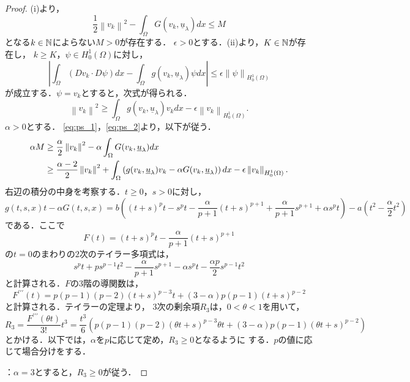 \begin{proof}
 (i)より，
 \begin{equation}
  \frac{1}{2} \left\| v_k \right\|^2 - \int_\Omega G(v_k,
   \underline{u}_\lambda )dx \leq M \label{eq:ps_1}
 \end{equation}
 となる$k \in \mathbb{N}$によらない$M > 0$が存在する．
 $\epsilon > 0$とする．(ii)より，$K \in \mathbb{N}$が存在し，
 $k \geq K$，$\psi \in H_0^1(\Omega)$に対し，
 \[
  \left\lvert \int_\Omega (D v_k \cdot D \psi) dx - \int_\Omega g(v_k,
 \underline{u}_\lambda)\psi dx \right\rvert \leq \epsilon \left\| \psi
 \right\|_{H_0^1(\Omega) }
 \]
 が成立する．$\psi = v_k$とすると，次式が得られる．
 \begin{equation}
  \left\| v_k \right\|^2 \geq \int_\Omega g(v_k,
   \underline{u}_\lambda)v_k dx - \epsilon \left\| v_k
   \right\|_{H_0^1(\Omega)}. \label{eq:ps_2}
 \end{equation}
 $\alpha > 0$とする．
 \eqref{eq:ps_1}，\eqref{eq:ps_2}より，以下が従う．
 \begin{align}
  \alpha M &\geq  \frac{\alpha}{2} \left\| v_k \right\|^2 - \alpha
  \int_\Omega G(v_k, \underline{u}_\lambda) dx \notag \\
  & \geq \frac{\alpha-2}{2} \left\| v_k \right\|^2 + \int_\Omega 
  \left( g(v_k, \underline{u}_\lambda)v_k - \alpha G(v_k,
  \underline{u}_\lambda)  \right) dx - \epsilon \left\| v_k
  \right\|_{H^1_0(\Omega)}. \label{eq:alpha_M}
 \end{align}
 右辺の積分の中身を考察する．$t \geq 0$，$s > 0$に対し，
 \[
   g(t, s, x)t - \alpha G(t, s, x)
  = b \left( (t+s)^p t - s^p t - \frac{\alpha}{p+1}(t+s)^{p+1} +
  \frac{\alpha}{p+1}s^{p+1} + \alpha s^p t \right) - a \left( t^2 -
  \frac{\alpha}{2} t^2 \right)
 \]
 である．ここで
 \[
  F(t) = (t+s)^p t - \frac{\alpha}{p+1}(t+s)^{p+1}
 \]
 の$t = 0$のまわりの$2$次のテイラー多項式は，
 \[
 s^pt + ps^{p-1} t^2 - \frac{\alpha}{p+1} s^{p+1} - \alpha s^p t -
 \frac{\alpha p}{2} s^{p-1} t^2 
 \]
 と計算される．$F$の$3$階の導関数は，
 \[
  F^{\prime\prime\prime}(t) = p(p-1)(p-2)(t+s)^{p-3} t + (3 - \alpha)
 p(p-1) (t+s)^{p-2}
 \]
 と計算される．テイラーの定理より，
 $3$次の剰余項$R_3$は，$0 < \theta < 1$を用いて，
 \[
  R_3 = \frac{F^{\prime\prime\prime}(\theta t)}{3!}t^3 = \frac{t^3}{6}
 \left( p(p-1)(p-2)(\theta t + s)^{p-3} \theta t + (3-\alpha) p(p-1)
 (\theta t + s)^{p-2} \right)
 \]
 とかける．以下では，$\alpha$を$p$に応じて定め，$R_3 \geq 0$となるように
 する．$p$の値に応じて場合分けをする．

 ：$\alpha = 3$とすると，$R_3 \geq 0$が従う．


\end{proof}
